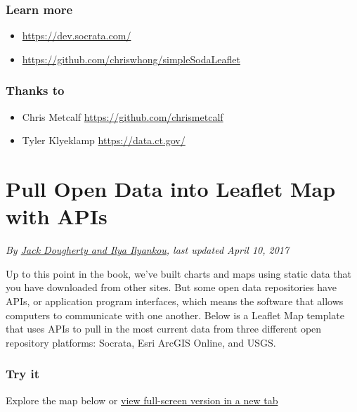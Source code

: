 \documentclass[
  english,
]{book}
\providecommand{\tightlist}{%
  \setlength{\itemsep}{0pt}\setlength{\parskip}{0pt}}
\begin{document}
\hypertarget{learn-more-23}{%
\subsubsection*{Learn more}\label{learn-more-23}}

\begin{itemize}
\tightlist
\item
  \url{https://dev.socrata.com/}
\item
  \url{https://github.com/chriswhong/simpleSodaLeaflet}
\end{itemize}

\hypertarget{thanks-to}{%
\subsubsection*{Thanks to}\label{thanks-to}}

\begin{itemize}
\tightlist
\item
  Chris Metcalf \url{https://github.com/chrismetcalf}
\item
  Tyler Klyeklamp \url{https://data.ct.gov/}
\end{itemize}

\hypertarget{leaflet-maps-open-apis}{%
\section{Pull Open Data into Leaflet Map with APIs}\label{leaflet-maps-open-apis}}

\emph{By \href{authors}{Jack Dougherty and Ilya Ilyankou}, last updated April 10, 2017}

Up to this point in the book, we've built charts and maps using static data that you have downloaded from other sites. But some open data repositories have APIs, or application program interfaces, which means the software that allows computers to communicate with one another. Below is a Leaflet Map template that uses APIs to pull in the most current data from three different open repository platforms: Socrata, Esri ArcGIS Online, and USGS.

\hypertarget{try-it-10}{%
\subsubsection*{Try it}\label{try-it-10}}

Explore the map below or \href{https://datavizforall.github.io/leaflet-data-apis}{view full-screen version in a new tab}
\end{document}
